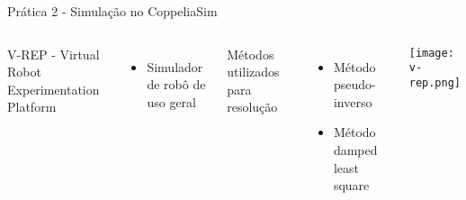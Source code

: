 \begin{frame}[c]{Prática 2 - Simulação no CoppeliaSim}
    \begin{columns}
        V-REP - Virtual Robot Experimentation Platform
        \begin{itemize} 
            \item Simulador de robô de uso geral
        \end{itemize}
        \singlespacing
        Métodos utilizados para resolução
        \begin{itemize}
            \item Método pseudo-inverso 
            \item Método damped least square
        \end{itemize}
            \centering
            \texttt{[image: v-rep.png]}
    \end{columns}
\end{frame}
